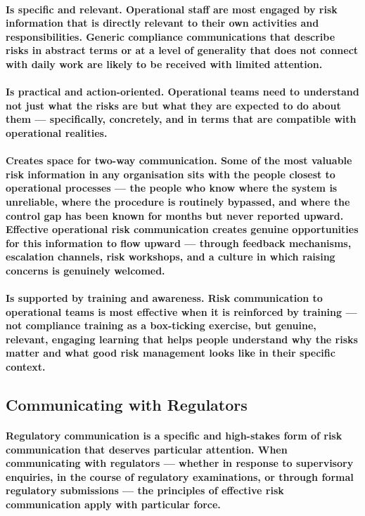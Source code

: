 \paragraph{\textbf{Is specific and relevant}. Operational staff are most engaged by risk information that is directly relevant to their own activities and responsibilities. Generic compliance communications that describe risks in abstract terms or at a level of generality that does not connect with daily work are likely to be received with limited attention.}
\paragraph{\textbf{Is practical and action-oriented}. Operational teams need to understand not just what the risks are but what they are expected to do about them — specifically, concretely, and in terms that are compatible with operational realities.}
\paragraph{\textbf{Creates space for two-way communication}. Some of the most valuable risk information in any organisation sits with the people closest to operational processes — the people who know where the system is unreliable, where the procedure is routinely bypassed, and where the control gap has been known for months but never reported upward. Effective operational risk communication creates genuine opportunities for this information to flow upward — through feedback mechanisms, escalation channels, risk workshops, and a culture in which raising concerns is genuinely welcomed.}
\paragraph{\textbf{Is supported by training and awareness}. Risk communication to operational teams is most effective when it is reinforced by training — not compliance training as a box-ticking exercise, but genuine, relevant, engaging learning that helps people understand why the risks matter and what good risk management looks like in their specific context.}

\subsection{Communicating with Regulators}
\paragraph{Regulatory communication is a specific and high-stakes form of risk communication that deserves particular attention. When communicating with regulators — whether in response to supervisory enquiries, in the course of regulatory examinations, or through formal regulatory submissions — the principles of effective risk communication apply with particular force.}
